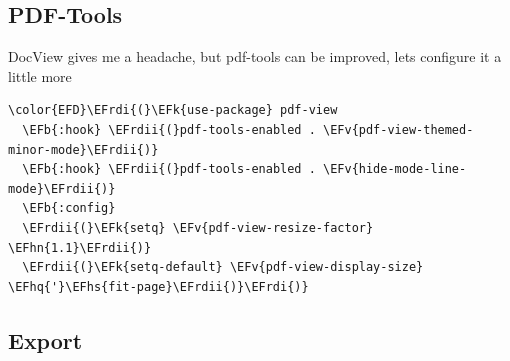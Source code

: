 \documentclass{scrartcl}
\newcommand{\EFk}[1]{\textcolor{EFk}{#1}} %
\newcommand{\EFb}[1]{\textcolor{EFb}{#1}} %
\newcommand{\EFv}[1]{\textcolor{EFv}{#1}} %
\newcommand{\EFhn}[1]{\textcolor{EFhn}{\textbf{#1}}} %
\newcommand{\EFhq}[1]{\textcolor{EFhq}{#1}} %
\newcommand{\EFhs}[1]{\textcolor{EFhs}{#1}} %
\newcommand{\EFrdi}[1]{\textcolor{EFrdi}{#1}} %
\newcommand{\EFrdii}[1]{\textcolor{EFrdii}{#1}} %
\begin{document}
\subsection{PDF-Tools}
\label{sec:orga0c9671}
DocView gives me a headache, but pdf-tools can be improved, lets configure it a little more
\begin{Code}
\begin{Verbatim}[]
\color{EFD}\EFrdi{(}\EFk{use-package} pdf-view
  \EFb{:hook} \EFrdii{(}pdf-tools-enabled . \EFv{pdf-view-themed-minor-mode}\EFrdii{)}
  \EFb{:hook} \EFrdii{(}pdf-tools-enabled . \EFv{hide-mode-line-mode}\EFrdii{)}
  \EFb{:config}
  \EFrdii{(}\EFk{setq} \EFv{pdf-view-resize-factor} \EFhn{1.1}\EFrdii{)}
  \EFrdii{(}\EFk{setq-default} \EFv{pdf-view-display-size} \EFhq{'}\EFhs{fit-page}\EFrdii{)}\EFrdi{)}
\end{Verbatim}
\end{Code}

\subsection{Export}
\label{sec:org3c725c7}
\end{document}
